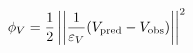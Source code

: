 \begin{equation}
    \phi_V = \frac{1}{2}\left|\left|\frac{1}{\varepsilon_V}(V_{\rm pred} - V_{\rm obs})\right|\right|^2
\label{eq:volume_data_misfit}
\end{equation}
